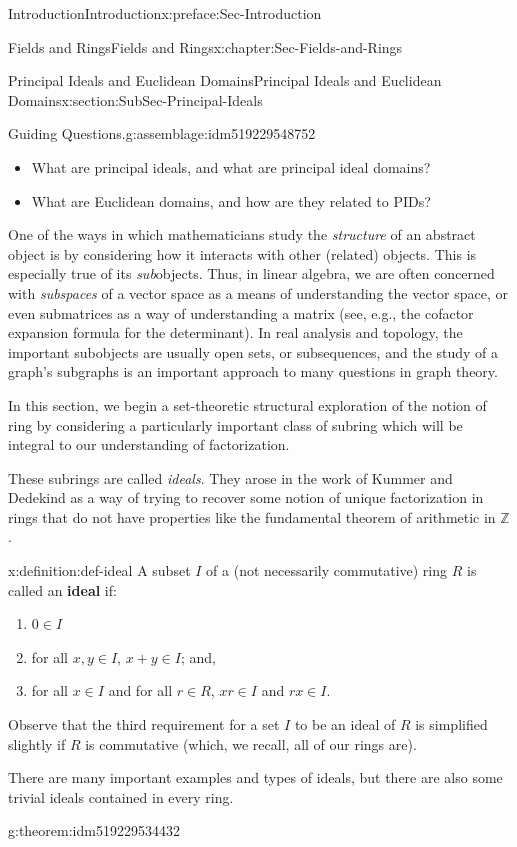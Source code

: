\documentclass[oneside,10pt,]{book}
\newcommand{\terminology}[1]{\textbf{#1}}
\numberwithin{equation}{section}
\def\Z{{\mathbb Z}}
\begin{document}
\begin{preface}{Introduction}{}{Introduction}{}{}{x:preface:Sec-Introduction}
\begin{chapterptx}{Fields and Rings}{}{Fields and Rings}{}{}{x:chapter:Sec-Fields-and-Rings}
\begin{sectionptx}{Principal Ideals and Euclidean Domains}{}{Principal Ideals and Euclidean Domains}{}{}{x:section:SubSec-Principal-Ideals}
\begin{assemblage}{Guiding Questions.}{g:assemblage:idm519229548752}
\begin{itemize}[label=\textbullet]
\item{}What are principal ideals, and what are principal ideal domains?%
\item{}What are Euclidean domains, and how are they related to PIDs?%
\end{itemize}
%
\end{assemblage}
One of the ways in which mathematicians study the \emph{structure} of an abstract object is by considering how it interacts with other (related) objects. This is especially true of its \emph{sub}objects. Thus, in linear algebra, we are often concerned with \emph{subspaces} of a vector space as a means of understanding the vector space, or even submatrices as a way of understanding a matrix (see, e.g., the cofactor expansion formula for the determinant). In real analysis and topology, the important subobjects are usually open sets, or subsequences, and the study of a graph's subgraphs is an important approach to many questions in graph theory.%
\par
In this section, we begin a set-theoretic structural exploration of the notion of ring by considering a particularly important class of subring which will be integral to our understanding of factorization.%
\par
These subrings are called \emph{ideals}. They arose in the work of Kummer and Dedekind as a way of trying to recover some notion of unique factorization in rings that do not have properties like the fundamental theorem of arithmetic in \(\Z\).%
\begin{definition}{}{x:definition:def-ideal}%
A subset \(I\) of a (not necessarily commutative) ring \(R\) is called an \terminology{ideal} if:%
\begin{enumerate}
\item{}\(0\in I\)%
\item{}for all \(x,y\in I\), \(x+y\in I\); and,%
\item{}for all \(x\in I\) and for all \(r\in R\), \(xr\in I\) and \(rx\in I\).%
\end{enumerate}
%
\end{definition}
Observe that the third requirement for a set \(I\) to be an ideal of \(R\) is simplified slightly if \(R\) is commutative (which, we recall, all of our rings are).%
\par
There are many important examples and types of ideals, but there are also some trivial ideals contained in every ring.%
\begin{theorem}{}{}{g:theorem:idm519229534432}%

\end{theorem}
\end{sectionptx}
\end{chapterptx}
\end{preface}
\end{document}
